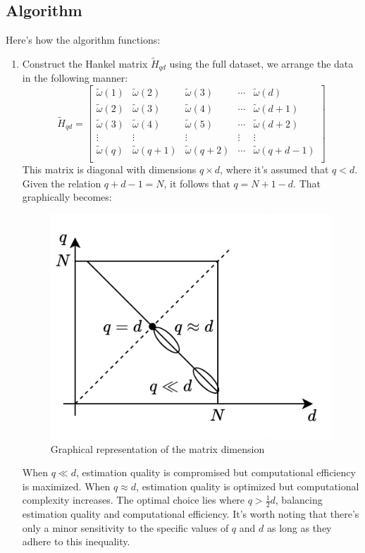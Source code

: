 \subsection{Algorithm}
Here's how the algorithm functions:
\begin{enumerate}
    \item Construct the Hankel matrix $\tilde{H}_{qd}$ using the full dataset, we arrange the data in the following manner:
        \[\tilde{H}_{qd}=\begin{bmatrix}
            \tilde{\omega}(1) & \tilde{\omega}(2) & \tilde{\omega}(3) & \cdots & \tilde{\omega}(d) \\ 
            \tilde{\omega}(2) & \tilde{\omega}(3) & \tilde{\omega}(4) & \cdots & \tilde{\omega}(d+1) \\ 
            \tilde{\omega}(3) & \tilde{\omega}(4) & \tilde{\omega}(5) & \cdots & \tilde{\omega}(d+2) \\ 
            \vdots & \vdots  & \vdots  & \vdots  & \vdots  \\ 
            \tilde{\omega}(q) & \tilde{\omega}(q+1) & \tilde{\omega}(q+2) & \cdots & \tilde{\omega}(q+d-1) \\ 
        \end{bmatrix}\]
        This matrix is diagonal with dimensions $q \times d$, where it's assumed that $q<d$. 
        Given the relation $q+d-1=N$, it follows that $q=N+1-d$.
        That graphically becomes: 
        \begin{figure}[H]
            \centering
            \includegraphics[width=0.4\linewidth]{images/qd.png}
            \caption{Graphical representation of the matrix dimension}
        \end{figure}
        When $q \ll d$, estimation quality is compromised but computational efficiency is maximized.
        When $q \approx d$, estimation quality is optimized but computational complexity increases.
        The optimal choice lies where $q>\frac{1}{2}d$, balancing estimation quality and computational efficiency.
        It's worth noting that there's only a minor sensitivity to the specific values of $q$ and $d$ as long as they adhere to this inequality.

\end{enumerate}
